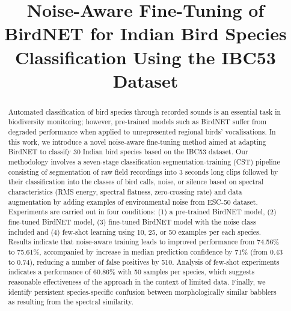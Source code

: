 \documentclass[conference]{IEEEtran}
\begin{document}
\title{Noise-Aware Fine-Tuning of BirdNET for Indian Bird Species Classification Using the IBC53 Dataset}

\author{
\IEEEauthorblockA{
}
}

\maketitle

\begin{abstract}
Automated classification of bird species through recorded sounds is an essential task in biodiversity monitoring; however, pre-trained models such as BirdNET suffer from degraded performance when applied to unrepresented regional birds' vocalisations. In this work, we introduce a novel noise-aware fine-tuning method aimed at adapting BirdNET to classify 30 Indian bird species based on the IBC53 dataset. Our methodology involves a seven-stage classification-segmentation-training (CST) pipeline consisting of segmentation of raw field recordings into 3 seconds long clips followed by their classification into the classes of bird calls, noise, or silence based on spectral characteristics (RMS energy, spectral flatness, zero-crossing rate) and data augmentation by adding examples of environmental noise from ESC-50 dataset. Experiments are carried out in four conditions: (1) a pre-trained BirdNET model, (2) fine-tuned BirdNET model, (3) fine-tuned BirdNET model with the noise class included and (4) few-shot learning using 10, 25, or 50 examples per each species. Results indicate that noise-aware training leads to improved performance from 74.56\% to 75.61\%, accompanied by increase in median prediction confidence by 71\% (from 0.43 to 0.74), reducing a number of false positives by 510. Analysis of few-shot experiments indicates a performance of 60.86\% with 50 samples per species, which suggests reasonable effectiveness of the approach in the context of limited data. Finally, we identify persistent species-specific confusion between morphologically similar babblers as resulting from the spectral similarity.
\end{abstract}
\end{document}
